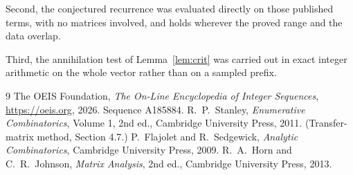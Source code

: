 \documentclass[11pt,a4paper]{article}
\theoremstyle{plain}
\theoremstyle{definition}
\begin{document}
Second, the conjectured recurrence was evaluated directly on those published terms, with no
matrices involved, and holds wherever the proved range and the data overlap.

Third, the annihilation test of Lemma~\ref{lem:crit} was carried out in exact integer
arithmetic on the whole vector rather than on a sampled prefix.

\begin{thebibliography}{9}
 The OEIS Foundation, \emph{The On-Line Encyclopedia of Integer
Sequences}, \url{https://oeis.org}, 2026. Sequence A185884.
 R.~P.~Stanley, \emph{Enumerative Combinatorics}, Volume 1, 2nd ed.,
Cambridge University Press, 2011. (Transfer-matrix method, Section 4.7.)
 P.~Flajolet and R.~Sedgewick, \emph{Analytic Combinatorics}, Cambridge
University Press, 2009.
 R.~A.~Horn and C.~R.~Johnson, \emph{Matrix Analysis}, 2nd ed., Cambridge
University Press, 2013.
\end{thebibliography}
\end{document}
